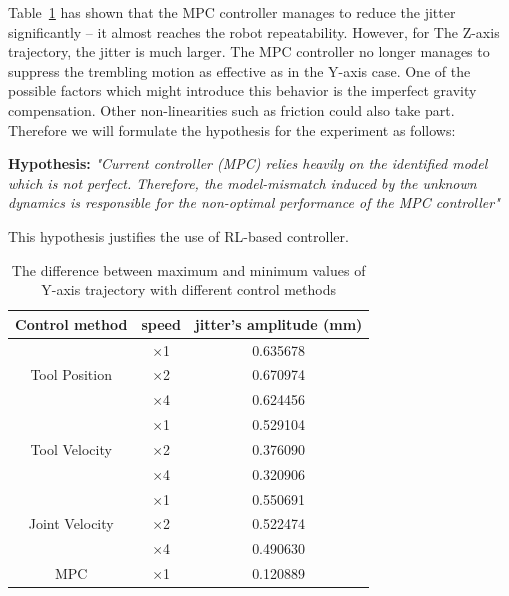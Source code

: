 Table~\ref{tab:y_jitter} has shown that the \ac {MPC} controller manages to reduce the jitter significantly -- it almost reaches the robot repeatability. However, for The Z-axis trajectory, the jitter is much larger. The \ac {MPC} controller no longer manages to suppress the trembling motion as effective as in the Y-axis case. One of the possible factors which might introduce this behavior is the imperfect gravity compensation. Other non-linearities such as friction could also take part. Therefore we will formulate the hypothesis for the experiment as follows:

\textbf{Hypothesis:} \textit{"Current controller (\ac {MPC}) relies heavily on the identified model which is not perfect. Therefore, the model-mismatch induced by the unknown dynamics is responsible for the non-optimal performance of the \ac {MPC} controller" }

This hypothesis justifies the use of \ac {RL}-based controller.

\begin{table}[h]
	\centering
	\caption{The difference between maximum and minimum values of Y-axis trajectory with different control methods}
	\begin{tabular}{|c|c|c|}
		\hline
		Control method & speed & jitter's amplitude (mm) \\
		\hline		
		& $ \times $1 & 0.635678\\
		Tool Position & $ \times $2 & 0.670974\\
		& $ \times $4 & 0.624456\\
		\hline		
		& $ \times $1 & 0.529104\\
		Tool Velocity & $ \times $2 & 0.376090\\
		& $ \times $4 & 0.320906\\
		\hline		
		& $ \times $1 & 0.550691\\
		Joint Velocity & $ \times $2 & 0.522474\\
		& $ \times $4 & 0.490630\\				
		\hline
		\ac {MPC} & $ \times $1 & 0.120889 \\
		\hline

	\end{tabular}
	\label{tab:y_jitter}
\end{table}

